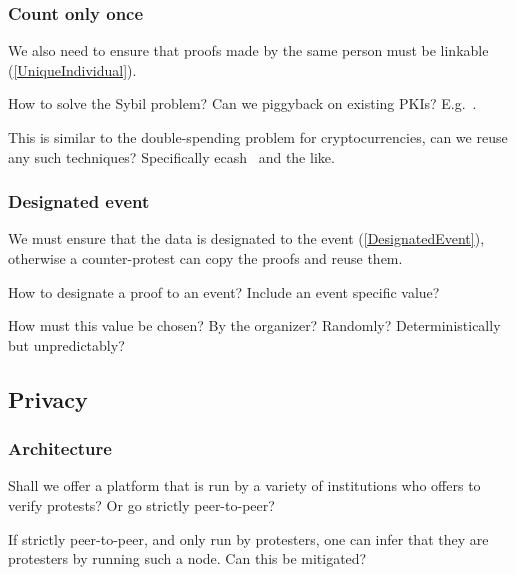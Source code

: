 \subsubsection{Count only once}

We also need to ensure that proofs made by the same person must be linkable 
(\cref{UniqueIndividual}).

\begin{frame}
  \begin{question}
    How to solve the Sybil problem?
    Can we piggyback on existing \acp{PKI}?
    E.g.~\cite{Cinderella}.
  \end{question}
  \begin{question}
    This is similar to the double-spending problem for cryptocurrencies, can 
    we reuse any such techniques?
    Specifically ecash~\cite{ecash} and the like.
  \end{question}
\end{frame}

\subsubsection{Designated event}

We must ensure that the data is designated to the event 
(\cref{DesignatedEvent}), otherwise a counter-protest can copy the proofs and 
reuse them.

\begin{frame}
  \begin{question}
    How to designate a proof to an event?
    Include an event specific value?
  \end{question}
  \begin{question}
    How must this value be chosen?
    By the organizer?
    Randomly?
    Deterministically but unpredictably?
  \end{question}
\end{frame}

\subsection{Privacy}

\subsubsection{Architecture}

\begin{frame}
  \begin{question}
    Shall we offer a platform that is run by a variety of institutions who 
    offers to verify protests?
    Or go strictly peer-to-peer?
  \end{question}
  \begin{question}
    If strictly peer-to-peer, and only run by protesters, one can infer that 
    they are protesters by running such a node.
    Can this be mitigated?
  \end{question}
\end{frame}

